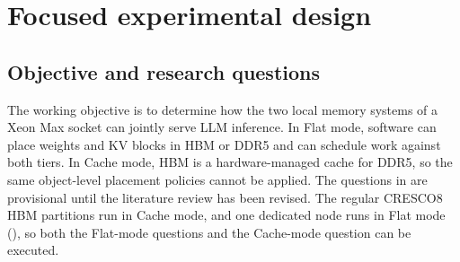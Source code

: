 
\section{Focused experimental design}
\label{sec:methodology}

\subsection{Objective and research questions}

The working objective is to determine how the two local memory systems
of a Xeon Max socket can jointly serve LLM inference.  In Flat mode,
software can place weights and KV blocks in HBM or DDR5 and can schedule
work against both tiers.  In Cache mode, HBM is a hardware-managed cache
for DDR5, so the same object-level placement policies cannot be applied.
The questions in  are provisional until
the literature review has been revised.  The regular CRESCO8 HBM
partitions run in Cache mode, and one dedicated node runs in Flat mode
(), so both the Flat-mode questions and the
Cache-mode question can be executed.

